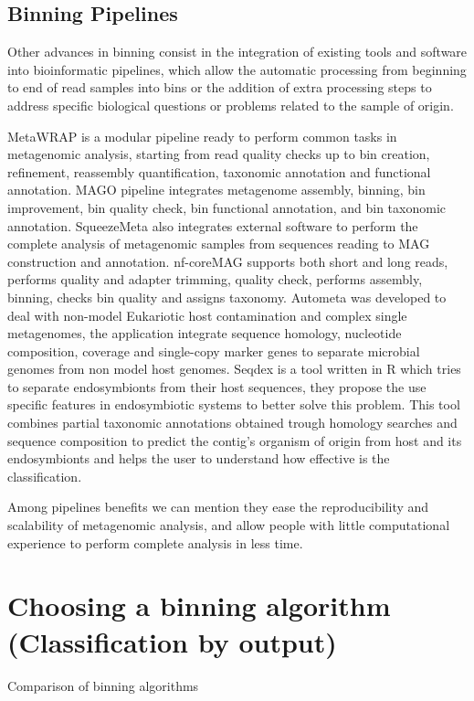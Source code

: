 \documentclass{article}
\begin{document}
\subsection{Binning Pipelines}
Other advances in binning consist in the integration of existing tools and software into bioinformatic pipelines, which  allow the automatic processing from beginning to end of read samples into bins or the addition of extra processing steps to address specific biological questions or problems related to the sample of origin.

MetaWRAP is a modular pipeline ready to perform common tasks in metagenomic analysis, starting from read quality checks up to bin creation, refinement, reassembly quantification, taxonomic annotation and functional annotation.
MAGO pipeline integrates metagenome assembly, binning, bin improvement, bin quality check, bin functional annotation, and bin taxonomic annotation. 
SqueezeMeta also integrates external software to perform the complete analysis of metagenomic samples from sequences reading to MAG construction and annotation.%
nf-coreMAG supports both short and long reads, performs quality and adapter trimming, quality check,  performs assembly, binning, checks bin quality  and assigns taxonomy.
Autometa was developed to deal with non-model Eukariotic host contamination and complex single metagenomes, the application integrate sequence homology, nucleotide composition, coverage and single-copy marker genes to separate microbial genomes from non model host genomes. 
Seqdex is a tool written in R which tries to separate endosymbionts from their host sequences, they propose the use specific features in endosymbiotic systems to better solve this problem. This tool combines partial taxonomic annotations obtained trough homology searches and sequence composition to predict the contig's organism of origin from host and its endosymbionts and helps the user to understand how effective is the classification.

Among pipelines benefits we can mention they ease the reproducibility and scalability of metagenomic analysis, and allow people with little computational experience to perform complete analysis in less time.

\section{Choosing a binning algorithm (Classification by output)}
\begin{table}
\begin{tiny}
\centering
\caption[Comparison of binning algorithms]{Comparison of binning algorithms}
	
\label{Tbinningsoftware}
\end{tiny}
\end{table}
\end{document}
